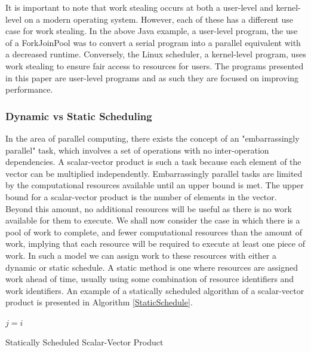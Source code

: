\documentclass[12pt]{article}
\begin{document}
It is important to note that work stealing occurs at both a user-level and kernel-level on a modern operating system. However, each of these has a different use case for work stealing. In the above Java example, a user-level program, the use of a ForkJoinPool was to convert a serial program into a parallel equivalent with a decreased runtime. Conversely, the Linux scheduler, a kernel-level program, uses work stealing to ensure fair access to resources for users. The programs presented in this paper are user-level programs and as such they are focused on improving performance.

\subsubsection{Dynamic vs Static Scheduling}
In the area of parallel computing, there exists the concept of an "embarrassingly parallel" task, which involves a set of operations with no inter-operation dependencies. A scalar-vector product is such a task because each element of the vector can be multiplied independently. Embarrassingly parallel tasks are limited by the computational resources available until an upper bound is met. The upper bound for a scalar-vector product is the number of elements in the vector. Beyond this amount, no additional resources will be useful as there is no work available for them to execute.
\newline
We shall now consider the case in which there is a pool of work to complete, and fewer computational resources than the amount of work, implying that each resource will be required to execute at least one piece of work. In such a model we can assign work to these resources with either a dynamic or static schedule.
\newline
A static method is one where resources are assigned work ahead of time, usually using some combination of resource identifiers and work identifiers. An example of a statically scheduled algorithm of a scalar-vector product is presented in Algorithm \ref{StaticSchedule}.

\IncMargin{1em}
\begin{algorithm}[H]
 \BlankLine

 $j = i$\;
 \caption{Statically Scheduled Scalar-Vector Product}
 \label{StaticSchedule}
\end{algorithm}
\DecMargin{1em}
\medskip
\end{document}
